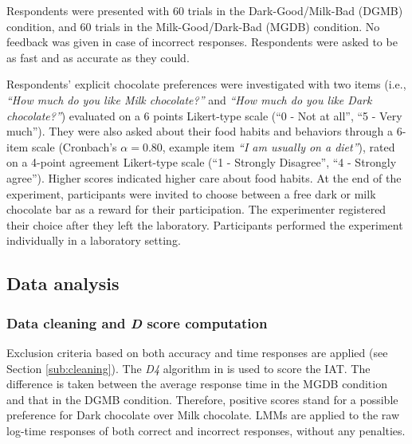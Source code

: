 \documentclass[12pt]{book}
\begin{document}

Respondents were presented with 60 trials in the Dark-Good/Milk-Bad (DGMB) condition, and 60 trials in the Milk-Good/Dark-Bad (MGDB) condition. 
No feedback was given in case of incorrect responses. 
Respondents were asked to be as fast and as accurate as they could.

Respondents' explicit chocolate preferences were investigated with two items (i.e., \textit{``How much do you like Milk chocolate?''} and \textit{``How much do you like Dark chocolate?''}) evaluated on a 6 points Likert-type scale (``0 - Not at all'', ``5 - Very much''). 
They were also asked about their food habits and behaviors through a 6-item scale (Cronbach's $\alpha = 0.80$, example item \textit{``I am usually on a diet''}), rated on a 4-point agreement Likert-type scale (``1 - Strongly Disagree'', ``4 - Strongly agree''). Higher scores indicated higher care about food habits. 
At the end of the experiment, participants were invited to choose between a free dark or milk chocolate bar as a reward for their participation. 
The experimenter registered their choice after they left the laboratory.
Participants performed the experiment individually in a laboratory setting.

\subsection{Data analysis}
\subsubsection{Data cleaning and \emph{D} score computation}

Exclusion criteria based on both accuracy \cite{Nosek2002} and time responses \cite{Greenwald2003} are applied (see Section \ref{sub:cleaning}). 
The \emph{D4} algorithm in  is used to score the IAT. 
The difference is taken between the average response time in the MGDB condition and that in the DGMB condition. Therefore, positive scores stand for a possible preference for Dark chocolate over Milk chocolate. 
LMMs are applied to the raw log-time responses of both correct and incorrect responses, without any penalties.
\end{document}
